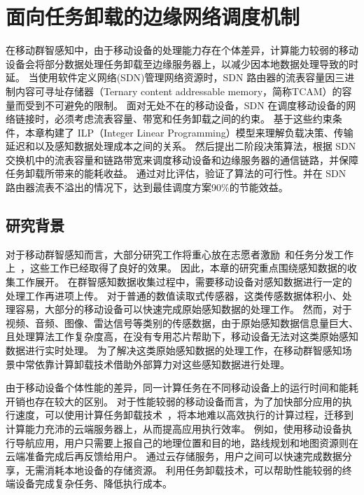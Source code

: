\chapter{面向任务卸载的边缘网络调度机制}

在移动群智感知中，由于移动设备的处理能力存在个体差异，计算能力较弱的移动设备会将部分数据处理任务卸载至边缘服务器上，以减少因本地数据处理导致的时延。
当使用软件定义网络(SDN)管理网络资源时，SDN 路由器的流表容量因三进制内容可寻址存储器（Ternary content addressable memory，简称TCAM）的容量而受到不可避免的限制。
面对无处不在的移动设备，SDN 在调度移动设备的网络链接时，必须考虑流表容量、带宽和任务卸载之间的约束。
基于这些约束条件，本章构建了 ILP（Integer Linear Programming）模型来理解负载决策、传输延迟和以及感知数据处理成本之间的关系。
然后提出二阶段决策算法，根据 SDN 交换机中的流表容量和链路带宽来调度移动设备和边缘服务器的通信链路，并保障任务卸载所带来的能耗收益。
通过对比评估，验证了算法的可行性。并在 SDN 路由器流表不溢出的情况下，达到最佳调度方案90\%的节能效益。

\section{研究背景}

对于移动群智感知而言，大部分研究工作将重心放在志愿者激励~\cite{CNKI:JiaChaopeng, DBLP:journals/comsur/ZhangYSLTXM16, CNKI:WuMCSIncentive}和任务分发工作上~\cite{DBLP:conf/huc/LiuGWWYZ16, DBLP:conf/infocom/Xiao0HWL15, DBLP:conf/mass/LiLW15}，这些工作已经取得了良好的效果。
因此，本章的研究重点围绕感知数据的收集工作展开。
在群智感知数据收集过程中，需要移动设备对感知数据进行一定的处理工作再进项上传。
对于普通的数值读取式传感器，这类传感数据体积小、处理容易，大部分的移动设备可以快速完成原始感知数据的处理工作。
然而，对于视频、音频、图像、雷达信号等类别的传感数据，由于原始感知数据信息量巨大、且处理算法工作复杂度高，在没有专用芯片帮助下，移动设备无法对这类原始感知数据进行实时处理。
为了解决这类原始感知数据的处理工作，在移动群智感知场景中常依靠计算卸载技术借助外部算力对这些感知数据进行处理。

由于移动设备个体性能的差异，同一计算任务在不同移动设备上的运行时间和能耗开销也存在较大的区别。
对于性能较弱的移动设备而言，为了加快部分应用的执行速度，可以使用计算任务卸载技术~\cite{Lee:2013fj, Linthicum:2017vv, Kumar:2013dq}，将本地难以高效执行的计算过程，迁移到计算能力充沛的云端服务器上，从而提高应用执行效率。
例如，使用移动设备执行导航应用，用户只需要上报自己的地理位置和目的地，路线规划和地图资源则在云端准备完成后再反馈给用户。
通过云存储服务，用户之间可以快速完成数据分享，无需消耗本地设备的存储资源。
利用任务卸载技术，可以帮助性能较弱的终端设备完成复杂任务、降低执行成本。

